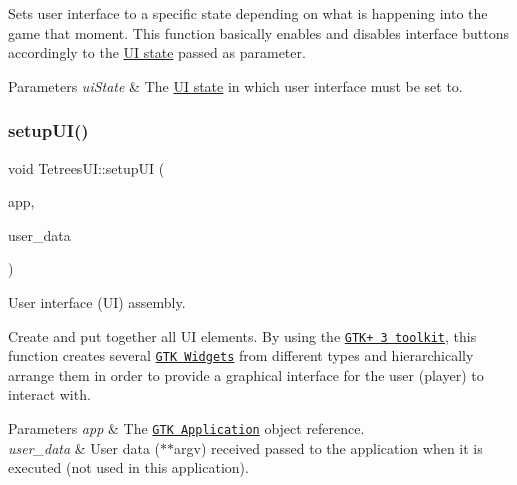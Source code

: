 Sets user interface to a specific state depending on what is happening into the game that moment. This function basically enables and disables interface buttons accordingly to the \hyperlink{TetreesDefs_8hpp_ab583135648b1264a9f7817709c4dbd3e}{UI state} passed as parameter. 
\begin{DoxyParams}{Parameters}
{\em ui\+State} & The \hyperlink{TetreesDefs_8hpp_ab583135648b1264a9f7817709c4dbd3e}{UI state} in which user interface must be set to. \\
\hline
\end{DoxyParams}
\mbox{\label{classTetreesUI_a492d68860089cfbe52c5756b2c3cd2ae}} 
\subsubsection{\texorpdfstring{setup\+U\+I()}{setupUI()}}
{\footnotesize\ttfamily void Tetrees\+U\+I\+::setup\+UI (\begin{DoxyParamCaption}\item[{Gtk\+Application $\ast$}]{app,  }\item[{gpointer}]{user\+\_\+data }\end{DoxyParamCaption})}



User interface (UI) assembly. 

Create and put together all UI elements. By using the \href{https://developer.gnome.org/gtk3/stable/}{\tt G\+T\+K+ 3 toolkit}, this function creates several \href{https://developer.gnome.org/gtk3/stable/GtkWidget.html}{\tt G\+TK Widgets} from different types and hierarchically arrange them in order to provide a graphical interface for the user (player) to interact with. 
\begin{DoxyParams}{Parameters}
{\em app} & The \href{https://developer.gnome.org/gtk3/stable/GtkApplication.html}{\tt G\+TK Application} object reference. \\
\hline
{\em user\+\_\+data} & User data ({\ttfamily $\ast$$\ast$argv}) received passed to the application when it is executed (not used in this application). \\
\hline
\end{DoxyParams}
\mbox{\label{classTetreesUI_a0fe8ccb5c1c594792591036f4f02175f}} 
